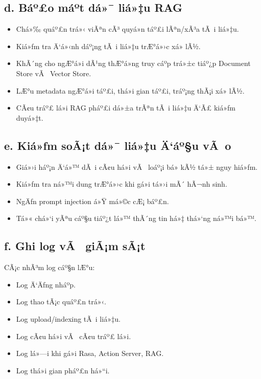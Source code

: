 ﻿\documentclass[12pt,a4paper]{report}
\begin{document}
\subsection*{d. Báº£o máº­t dá»¯ liá»‡u RAG}

\begin{itemize}
    \item Chá»‰ quáº£n trá»‹ viÃªn cÃ³ quyá»n táº£i lÃªn/xÃ³a tÃ i liá»‡u.
    \item Kiá»ƒm tra Ä‘á»‹nh dáº¡ng tÃ i liá»‡u trÆ°á»›c xá»­ lÃ½.
    \item KhÃ´ng cho ngÆ°á»i dÃ¹ng thÆ°á»ng truy cáº­p trá»±c tiáº¿p Document Store vÃ  Vector Store.
    \item LÆ°u metadata ngÆ°á»i táº£i, thá»i gian táº£i, tráº¡ng thÃ¡i xá»­ lÃ½.
    \item CÃ¢u tráº£ lá»i RAG pháº£i dá»±a trÃªn tÃ i liá»‡u Ä‘Ã£ kiá»ƒm duyá»‡t.
\end{itemize}

\subsection*{e. Kiá»ƒm soÃ¡t dá»¯ liá»‡u Ä‘áº§u vÃ o}

\begin{itemize}
    \item Giá»›i háº¡n Ä‘á»™ dÃ i cÃ¢u há»i vÃ  loáº¡i bá» kÃ½ tá»± nguy hiá»ƒm.
    \item Kiá»ƒm tra ná»™i dung trÆ°á»›c khi gá»­i tá»›i mÃ´ hÃ¬nh sinh.
    \item NgÄƒn prompt injection á»Ÿ má»©c cÆ¡ báº£n.
    \item Tá»« chá»‘i yÃªu cáº§u tiáº¿t lá»™ thÃ´ng tin há»‡ thá»‘ng ná»™i bá»™.
\end{itemize}

\subsection*{f. Ghi log vÃ  giÃ¡m sÃ¡t}

CÃ¡c nhÃ³m log cáº§n lÆ°u:
\begin{itemize}
    \item Log Ä‘Äƒng nháº­p.
    \item Log thao tÃ¡c quáº£n trá»‹.
    \item Log upload/indexing tÃ i liá»‡u.
    \item Log cÃ¢u há»i vÃ  cÃ¢u tráº£ lá»i.
    \item Log lá»—i khi gá»i Rasa, Action Server, RAG.
    \item Log thá»i gian pháº£n há»“i.
\end{itemize}
\end{document}
